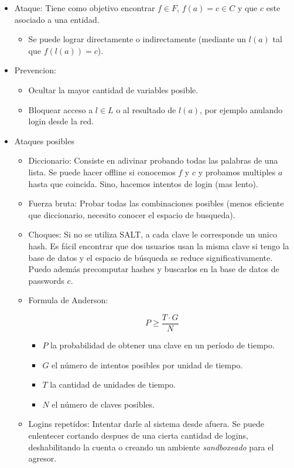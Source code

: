 \begin{itemize}
	\item Ataque: Tiene como objetivo encontrar $f \in F$, $f(a) = c \in C$ y que $c$ este asociado a una entidad.
		\begin{itemize}
			\item Se puede lograr directamente o indirectamente (mediante un $l(a)$ tal que $f(l(a)) = c$).
		\end{itemize}
	\item Prevencion: \begin{itemize}
		\item Ocultar la mayor cantidad de variables posible.
		\item Bloquear acceso a $l \in L$ o al resultado de $l(a)$, por ejemplo anulando login desde la red.
	\end{itemize}
	\item Ataques posibles
	\begin{itemize}
		\item Diccionario: Consiste en adivinar probando todas las palabras de una lista. Se puede hacer offline
		si conocemos $f$ y $c$ y probamos multiples $a$ hasta que coincida. Sino, hacemos intentos de login (mas lento).
		\item Fuerza bruta: Probar todas las combinaciones posibles (menos eficiente que diccionario, necesito conocer
		el espacio de busqueda).
		\item Choques: Si no se utiliza SALT, a cada clave le corresponde un unico hash. Es fácil encontrar que dos usuarios
		usan la misma clave si tengo la base de datos y el espacio de búsqueda se reduce significativamente. Puedo además
		precomputar hashes y buscarlos en la base de datos de passwords $c$.
		\item Formula de Anderson:

		$$ P \geq \frac{T \cdot G}{N}$$
	
		\begin{itemize}
			\item $P$ la probabilidad de obtener una clave en un período de tiempo.
			\item $G$ el número de intentos posibles por unidad de tiempo.
			\item $T$ la cantidad de unidades de tiempo.
			\item $N$ el número de claves posibles.
		\end{itemize}

		\item Logins repetidos: Intentar darle al sistema desde afuera. Se puede enlentecer cortando despues de una
		cierta cantidad de logins, deshabilitando la cuenta o creando un ambiente \textit{sandboxeado} para el agresor.
	\end{itemize}
\end{itemize}

